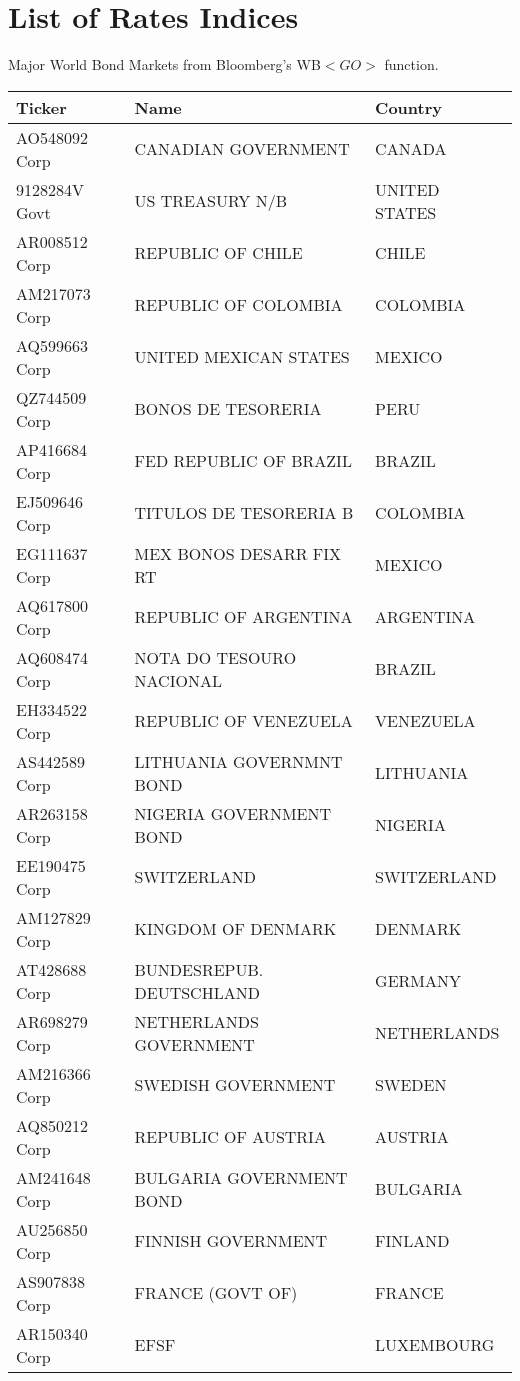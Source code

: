 \chapter{List of Rates Indices} \label{sec.C} 
Major World Bond Markets from Bloomberg's WB$<GO>$ function\cite{bloomberg}.

\begin {table}[H]
\begin{center}
\small
\begin{tabu}{| l l l |} 
\hline
Ticker & Name & Country \\
\hline
AO548092 Corp & CANADIAN GOVERNMENT & CANADA \\
9128284V Govt & US TREASURY N/B & UNITED STATES \\
AR008512 Corp & REPUBLIC OF CHILE & CHILE \\
AM217073 Corp & REPUBLIC OF COLOMBIA & COLOMBIA \\
AQ599663 Corp & UNITED MEXICAN STATES & MEXICO \\
QZ744509 Corp & BONOS DE TESORERIA & PERU \\
AP416684 Corp & FED REPUBLIC OF BRAZIL & BRAZIL \\
EJ509646 Corp & TITULOS DE TESORERIA B & COLOMBIA \\
EG111637 Corp & MEX BONOS DESARR FIX RT & MEXICO \\
AQ617800 Corp & REPUBLIC OF ARGENTINA & ARGENTINA \\
AQ608474 Corp & NOTA DO TESOURO NACIONAL & BRAZIL \\
EH334522 Corp & REPUBLIC OF VENEZUELA & VENEZUELA \\
AS442589 Corp & LITHUANIA GOVERNMNT BOND & LITHUANIA \\
AR263158 Corp & NIGERIA GOVERNMENT BOND & NIGERIA \\
EE190475 Corp & SWITZERLAND & SWITZERLAND \\
AM127829 Corp & KINGDOM OF DENMARK & DENMARK \\
AT428688 Corp & BUNDESREPUB. DEUTSCHLAND & GERMANY \\
AR698279 Corp & NETHERLANDS GOVERNMENT & NETHERLANDS \\
AM216366 Corp & SWEDISH GOVERNMENT & SWEDEN \\
AQ850212 Corp & REPUBLIC OF AUSTRIA & AUSTRIA \\
AM241648 Corp & BULGARIA GOVERNMENT BOND & BULGARIA \\
AU256850 Corp & FINNISH GOVERNMENT & FINLAND \\
AS907838 Corp & FRANCE (GOVT OF) & FRANCE \\
AR150340 Corp & EFSF & LUXEMBOURG \\
\hline
\end{tabu}
\small
\end{center}
\end{table}

